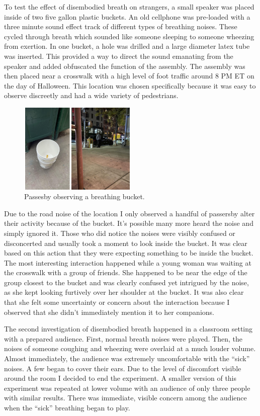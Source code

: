 \documentclass[letterpaper]{article}
\begin{document}
To test the effect of disembodied breath on strangers, a small speaker was placed inside of two five gallon plastic buckets. An old cellphone was pre-loaded with a three minute sound effect track of different types of breathing noises. These cycled through breath which sounded like someone sleeping to someone wheezing from exertion. In one bucket, a hole was drilled and a large diameter latex tube was inserted. This provided a way to direct the sound emanating from the speaker and added obfuscated the function of the assembly. The assembly was then placed near a crosswalk with a high level of foot traffic around 8 PM ET on the day of Halloween. This location was chosen specifically because it was easy to observe discreetly and had a wide variety of pedestrians. 

\begin{figure}[h]
\includegraphics[width=0.5\textwidth]{images/buckettest.png}
\caption{Passesby observing a breathing bucket.}
\end{figure}

Due to the road noise of the location I only observed a handful of passersby alter their activity because of the bucket. It's possible many more heard the noise and simply ignored it. Those who did notice the noises were visibly confused or disconcerted and usually took a moment to look inside the bucket. It was clear based on this action that they were expecting something to be inside the bucket. The most interesting interaction happened while a young woman was waiting at the crosswalk with a group of friends. She happened to be near the edge of the group closest to the bucket and was clearly confused yet intrigued by the noise, as she kept looking furtively over her shoulder at the bucket. It was also clear that she felt some uncertainty or concern about the interaction because I observed that she didn’t immediately mention it to her companions.

The second investigation of disembodied breath happened in a classroom setting with a prepared audience. First, normal breath noises were played. Then, the noises of someone coughing and wheezing were overlaid at a much louder volume. Almost immediately, the audience was extremely uncomfortable with the ``sick'' noises. A few began to cover their ears. Due to the level of discomfort visible around the room I decided to end the experiment. A smaller version of this experiment was repeated at lower volume with an audience of only three people with similar results. There was immediate, visible concern among the audience when the ``sick'' breathing began to play.
\end{document}
